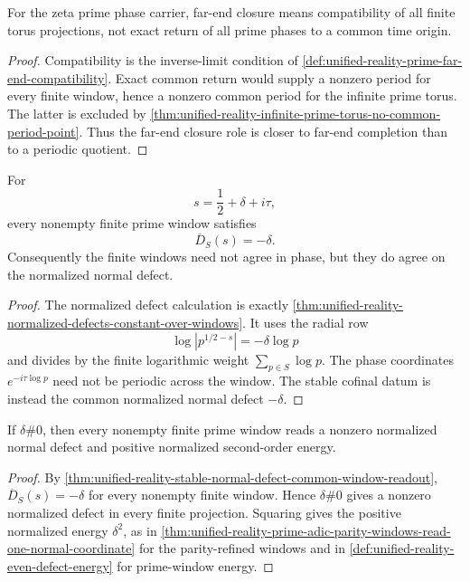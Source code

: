 \begin{theorem}
\label{thm:unified-reality-far-end-compatibility-not-phase-periodicity}
For the zeta prime phase carrier, far-end closure means compatibility of
all finite torus projections, not exact return of all prime phases to a
common time origin.
\end{theorem}

\begin{proof}
Compatibility is the inverse-limit condition of
\autoref{def:unified-reality-prime-far-end-compatibility}.  Exact common
return would supply a nonzero period for every finite window, hence a
nonzero common period for the infinite prime torus.  The latter is
excluded by
\autoref{thm:unified-reality-infinite-prime-torus-no-common-period-point}.
Thus the far-end closure role is closer to far-end completion than to a
periodic quotient.
\end{proof}

\begin{theorem}
\label{thm:unified-reality-stable-normal-defect-common-window-readout}
For
$$
s=\frac12+\delta+i\tau,
$$
every nonempty finite prime window satisfies
$$
\overline D_S(s)=-\delta.
$$
Consequently the finite windows need not agree in phase, but they do
agree on the normalized normal defect.
\end{theorem}

\begin{proof}
The normalized defect calculation is exactly
\autoref{thm:unified-reality-normalized-defects-constant-over-windows}.
It uses the radial row
$$
\log |p^{1/2-s}|=-\delta\log p
$$
and divides by the finite logarithmic weight
$\sum_{p\in S}\log p$.  The phase coordinates
$e^{-i\tau\log p}$ need not be periodic across the window.  The stable
cofinal datum is instead the common normalized normal defect $-\delta$.
\end{proof}

\begin{corollary}
\label{cor:unified-reality-off-half-visible-every-finite-torus-readout}
If $\delta\#0$, then every nonempty finite prime window reads a nonzero
normalized normal defect and positive normalized second-order energy.
\end{corollary}

\begin{proof}
By
\autoref{thm:unified-reality-stable-normal-defect-common-window-readout},
$\overline D_S(s)=-\delta$ for every nonempty finite window.  Hence
$\delta\#0$ gives a nonzero normalized defect in every finite projection.
Squaring gives the positive normalized energy
$\delta^2$, as in
\autoref{thm:unified-reality-prime-adic-parity-windows-read-one-normal-coordinate}
for the parity-refined windows and in
\autoref{def:unified-reality-even-defect-energy} for prime-window energy.
\end{proof}

